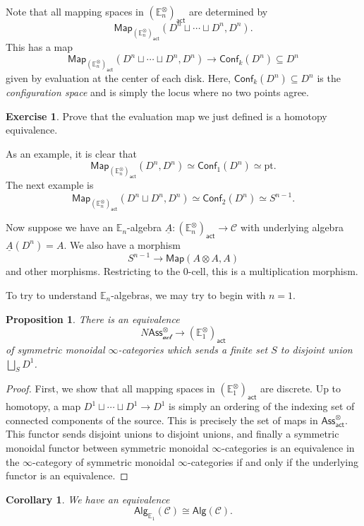 \documentclass[10pt, oneside]{memoir}
\newtheorem{cor}[thm]{Corollary}
\newtheorem{prop}[thm]{Proposition}
\theoremstyle{definition}
\newtheorem{exer}[thm]{Exercise}
\theoremstyle{remark}
\theoremstyle{plain}
\theoremstyle{definition}
\theoremstyle{remark}
\newcommand{\E}{\mathbb{E}}
\newcommand{\mc}[1]{\mathcal{#1}}
\newcommand{\mr}[1]{\mathrm{#1}}
\newcommand{\ms}[1]{\mathsf{#1}}
\newcommand{\ul}[1]{\underline{#1}}
\newcommand{\1}{\mathbf{1}}
\newcommand{\2}{\mathbf{2}}
\newcommand{\3}{\mathbf{3}}
\newcommand{\pt}{\mr{pt}}
\begin{document}
Note that all mapping spaces in $(\E_n^{\otimes})_{\ms{act}}$ are determined by
\[ \ms{Map}_{(\E_n^{\otimes})_{\ms{act}}} (D^n \sqcup \cdots \sqcup D^n, D^n). \]
This has a map
\[ \ms{Map}_{(\E_n^{\otimes})_{\ms{act}}} (D^n \sqcup \cdots \sqcup D^n, D^n) \to \ms{Conf}_k (D^n) \subseteq D^n \]
given by evaluation at the center of each disk. Here, $\ms{Conf}_k(D^n) \subseteq D^n$ is the \textit{configuration space} and is simply the locus where no two points agree.

\begin{exer}
    Prove that the evaluation map we just defined is a homotopy equivalence.
\end{exer}

As an example, it is clear that
\[ \ms{Map}_{(\E_n^{\otimes})_{\ms{act}}} (D^n, D^n) \simeq \ms{Conf}_1 (D^n) \simeq \pt. \]
The next example is
\[ \ms{Map}_{(\E_n^{\otimes})_{\ms{act}}} (D^n \sqcup D^n, D^n) \simeq \ms{Conf}_2 (D^n) \simeq S^{n-1}. \]

Now suppose we have an $\E_n$-algebra $\ul{A} \colon (\E_n^{\otimes})_{\ms{act}} \to \mc{C}$ with underlying algebra $\ul{A}(D^n) = A$. We also have a morphism
\[ S^{n-1} \to \ms{Map}(A \otimes A, A) \]
and other morphisms. Restricting to the $0$-cell, this is a multiplication morphism.

To try to understand $\E_n$-algebras, we may try to begin with $n=1$.
\begin{prop}
    There is an equivalence
    \[ N\ms{Ass}_{\mc{act}}^{\otimes} \to (\E_1^{\otimes})_{\ms{act}} \]
    of symmetric monoidal $\infty$-categories which sends a finite set $S$ to disjoint union $\bigsqcup_S D^1$.
\end{prop}

\begin{proof}
    First, we show that all mapping spaces in $(\E_1^{\otimes})_{\ms{act}}$ are discrete. Up to homotopy, a map $D^1 \sqcup \cdots \sqcup D^1 \to D^1$ is simply an ordering of the indexing set of connected components of the source. This is precisely the set of maps in $\ms{Ass}_{\ms{act}}^{\otimes}$. This functor sends disjoint unions to disjoint unions, and finally a symmetric monoidal functor between symmetric monoidal $\infty$-categories is an equivalence in the $\infty$-category of symmetric monoidal $\infty$-categories if and only if the underlying functor is an equivalence.
\end{proof}

\begin{cor}
    We have an equivalence
    \[ \ms{Alg}_{\E_1}(\mc{C}) \cong \ms{Alg}(\mc{C}). \]
\end{cor}
\end{document}
